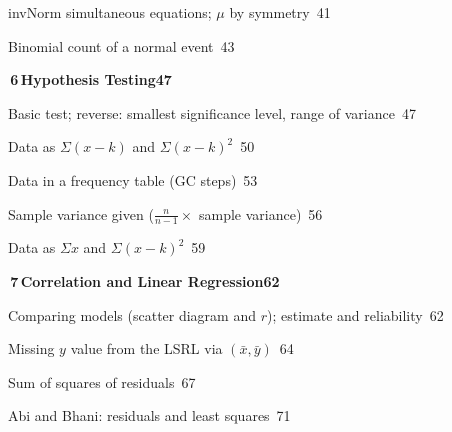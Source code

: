 \documentclass[a4paper,openany]{book}
\begin{document}
{\noindent{}\quad invNorm simultaneous equations; $\mu $ by symmetry\dotfill\ 41\par
\noindent{}\quad Binomial count of a normal event\dotfill\ 43\par
\medskip\noindent\colorbox{blue!8}{\parbox{\dimexpr\textwidth-2\fboxsep}{\large\bfseries\color{blue!50!black}\colorbox{blue!50!black}{\color{white}\,6\,}\quad Hypothesis Testing\hfill 47}}\par\nopagebreak\smallskip\nopagebreak
\noindent{}\quad Basic test; reverse: smallest significance level, range of variance\dotfill\ 47\par
\noindent{}\quad Data as $\Sigma (x-k)$ and $\Sigma (x-k)^2$\dotfill\ 50\par
\noindent{}\quad Data in a frequency table (GC steps)\dotfill\ 53\par
\noindent{}\quad Sample variance given ($\frac {n}{n-1}\times $ sample variance)\dotfill\ 56\par
\noindent{}\quad Data as $\Sigma x$ and $\Sigma (x-k)^2$\dotfill\ 59\par
\medskip\noindent\colorbox{blue!8}{\parbox{\dimexpr\textwidth-2\fboxsep}{\large\bfseries\color{blue!50!black}\colorbox{blue!50!black}{\color{white}\,7\,}\quad Correlation and Linear Regression\hfill 62}}\par\nopagebreak\smallskip\nopagebreak
\noindent{}\quad Comparing models (scatter diagram and $r$); estimate and reliability\dotfill\ 62\par
\noindent{}\quad Missing $y$ value from the LSRL via $(\bar x,\bar y)$\dotfill\ 64\par
\noindent{}\quad Sum of squares of residuals\dotfill\ 67\par
\noindent{}\quad Abi and Bhani: residuals and least squares\dotfill\ 71\par
}
\end{document}
